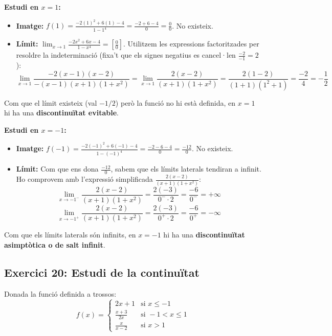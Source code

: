 \documentclass[12pt,a4paper]{article}
\begin{document}
\textbf{Estudi en $x = 1$:}
\begin{itemize}
    \item \textbf{Imatge:} $f(1) = \frac{-2(1)^2 + 6(1) - 4}{1 - 1^4} = \frac{-2 + 6 - 4}{0} = \frac{0}{0}$. No existeix.
    \item \textbf{Límit:} $\lim_{x \to 1} \frac{-2x^2 + 6x - 4}{1 - x^4} = \left[\frac{0}{0}\right]$. Utilitzem les expressions factoritzades per resoldre la indeterminació (fixa't que els signes negatius es cancel·len $\frac{-2}{-1} = 2$):
    \[ \lim_{x \to 1} \frac{-2(x - 1)(x - 2)}{-(x - 1)(x + 1)(1 + x^2)} = \lim_{x \to 1} \frac{2(x - 2)}{(x + 1)(1 + x^2)} = \frac{2(1 - 2)}{(1 + 1)(1^2 + 1)} = \frac{-2}{4} = -\frac{1}{2} \]
\end{itemize}
Com que el límit existeix (val $-1/2$) però la funció no hi està definida, en $x = 1$ hi ha una \textbf{discontinuïtat evitable}.

\textbf{Estudi en $x = -1$:}
\begin{itemize}
    \item \textbf{Imatge:} $f(-1) = \frac{-2(-1)^2 + 6(-1) - 4}{1 - (-1)^4} = \frac{-2 - 6 - 4}{0} = \frac{-12}{0}$. No existeix.
    \item \textbf{Límit:} Com que ens dona $\frac{-12}{0}$, sabem que els límits laterals tendiran a infinit. Ho comprovem amb l'expressió simplificada $\frac{2(x - 2)}{(x + 1)(1 + x^2)}$:
    \[ \lim_{x \to -1^-} \frac{2(x - 2)}{(x + 1)(1 + x^2)} = \frac{2(-3)}{0^- \cdot 2} = \frac{-6}{0^-} = +\infty \]
    \[ \lim_{x \to -1^+} \frac{2(x - 2)}{(x + 1)(1 + x^2)} = \frac{2(-3)}{0^+ \cdot 2} = \frac{-6}{0^+} = -\infty \]
\end{itemize}
Com que els límits laterals són infinits, en $x = -1$ hi ha una \textbf{discontinuïtat asimptòtica o de salt infinit}.
\vspace{1cm}

\subsection*{Exercici 20: Estudi de la continuïtat}

Donada la funció definida a trossos:
\[ f(x) = \begin{cases} 
2x + 1 & \text{si } x \le -1 \\ 
\frac{x + 3}{2x} & \text{si } -1 < x \le 1 \\ 
\frac{x}{x - 2} & \text{si } x > 1 
\end{cases} \]
\end{document}
